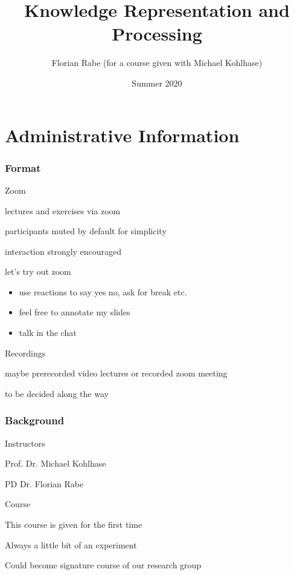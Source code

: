 \documentclass{beamer}
\begin{document}
\title{Knowledge Representation and Processing}
\author{Florian Rabe (for a course given with Michael Kohlhase)}
\date{Summer 2020}
\begin{frame}
    \titlepage
\end{frame}

\section{Administrative Information}

\begin{frame}\frametitle{Format}
\begin{blockitems}{Zoom}
\item lectures and exercises via zoom
\item participants muted by default for simplicity
\item interaction strongly encouraged
\item let's try out zoom
 \begin{itemize}
 \item use reactions to say yes no, ask for break etc.
 \item feel free to annotate my slides
 \item talk in the chat
 \end{itemize}
\end{blockitems}

\begin{blockitems}{Recordings}
\item maybe prerecorded video lectures or recorded zoom meeting
\item to be decided along the way
\end{blockitems}
\end{frame}


\begin{frame}\frametitle{Background}
\begin{blockitems}{Instructors}
\item Prof. Dr. Michael Kohlhase 
\item PD Dr. Florian Rabe 
\end{blockitems}

\begin{blockitems}{Course}
\item This course is given for the first time
\item Always a little bit of an experiment
\item Could become signature course of our research group 
\end{blockitems}
\end{frame}
\end{document}
